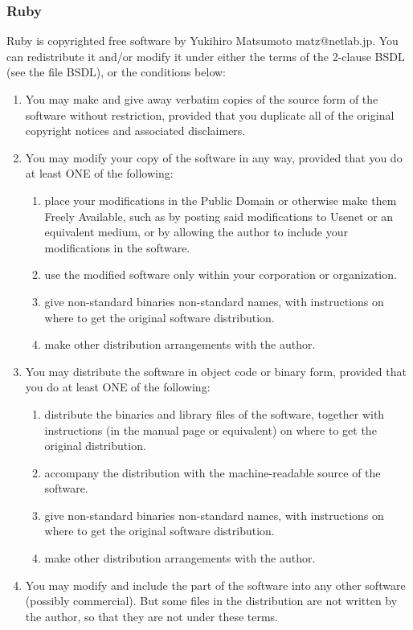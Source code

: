 \documentclass[11pt,a4paper, twoside]{article}
\begin{document}
\subsubsection{Ruby}
Ruby is copyrighted free software by Yukihiro Matsumoto matz@netlab.jp.
You can redistribute it and/or modify it under either the terms of the
2-clause BSDL (see the file BSDL), or the conditions below:
\begin{enumerate}
\item  You may make and give away verbatim copies of the source form of the
     software without restriction, provided that you duplicate all of the
     original copyright notices and associated disclaimers.
\item You may modify your copy of the software in any way, provided that
     you do at least ONE of the following:
     \begin{enumerate}
     	\item  place your modifications in the Public Domain or otherwise
          make them Freely Available, such as by posting said
	  modifications to Usenet or an equivalent medium, or by allowing
	  the author to include your modifications in the software.
	  	\item use the modified software only within your corporation or
          organization.
        \item give non-standard binaries non-standard names, with
          instructions on where to get the original software distribution.
        \item make other distribution arrangements with the author.
     \end{enumerate}
\item You may distribute the software in object code or binary form,
     provided that you do at least ONE of the following:
     \begin{enumerate}
     	\item distribute the binaries and library files of the software,
	  together with instructions (in the manual page or equivalent)
	  on where to get the original distribution.
	  	\item accompany the distribution with the machine-readable source of
	  the software.
	  	\item give non-standard binaries non-standard names, with
          instructions on where to get the original software distribution.
        \item make other distribution arrangements with the author.
     \end{enumerate}
\item You may modify and include the part of the software into any other
     software (possibly commercial).  But some files in the distribution
     are not written by the author, so that they are not under these terms.


\end{enumerate}
\end{document}
